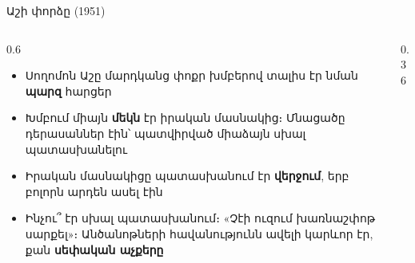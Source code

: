 \begin{frame}{Աշի փորձը (1951)}
  \begin{columns}[c]
    \begin{column}{0.6\textwidth}
      \begin{itemize}
        \item Սողոմոն Աշը մարդկանց փոքր խմբերով տալիս էր նման \textbf{պարզ} հարցեր
        \item Խմբում միայն \textbf{մեկն} էր իրական մասնակից։ Մնացածը դերասաններ էին՝ պատվիրված միաձայն սխալ պատասխանելու
        \item Իրական մասնակիցը պատասխանում էր \textbf{վերջում}, երբ բոլորն արդեն ասել էին
        \item<2-> Ինչու՞ էր սխալ պատասխանում։ «Չէի ուզում խառնաշփոթ սարքել»։ Անծանոթների հավանությունն ավելի կարևոր էր, քան \textbf{սեփական աչքերը}
      \end{itemize}
    \end{column}
    \begin{column}{0.36\textwidth}
      \centering
    \end{column}
  \end{columns}
\end{frame}

